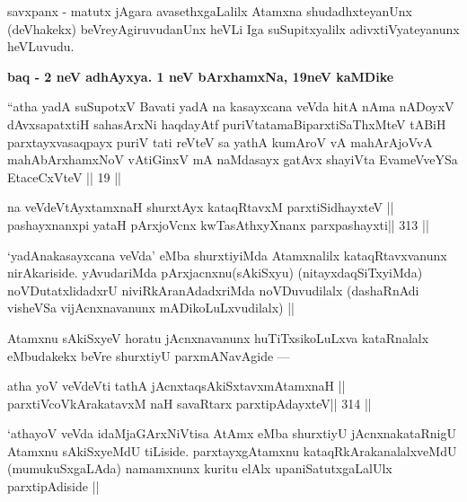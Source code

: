 \begin{artha}
savxpanx - matutx jAgara avasethxgaLalilx Atamxna shudadhxteyanUnx 
(deVhakekx) beVreyAgiruvudanUnx heVLi Iga suSupitxyalilx adivxtiVyateyanunx heVLuvudu.
\end{artha}

\begin{center}
{\large\bf baq - 2 neV adhAyxya. 1 neV bArxhamxNa, 19neV kaMDike}
\end{center}

\begin{shl}
``atha yadA suSupotxV Bavati yadA na kasayxcana veVda
hitA nAma nADoyxV dAvxsapatxtiH sahasArxNi haqdayAtf
puriVtatamaBiparxtiSaThxMteV tABiH parxtayxvasaqpayx puriV
tati reVteV sa yathA kumAroV vA mahArAjoVvA 
mahAbArxhamxNoV vA\s tiGinxV mA naMdasayx gatAvx shayiVta 
EvameVveYSa EtaceCxVteV || 19 ||
\end{shl}


\begin{shl}
na veVdeVtAyxtamxnaH shurxtAyx kataqRtavxM parxtiSidhayxteV ||
pashayxnanxpi yataH pArxjoVcnx kwTasAthxyXnanx parxpashayxti\hfill || 313 ||
\end{shl}

\begin{artha}
`yadAnakasayxcana veVda' eMba shurxtiyiMda Atamxnalilx kataqRtavxvanunx 
nirAkariside. yAvudariMda pArxjacnxnu(sAkiSxyu) (nitayxdaqSiTxyiMda) 
noVDutatxlidadxrU niviRkAranAdadxriMda noVDuvudilalx (dashaRnAdi visheVSa vijAcnxnavanunx mADikoLuLxvudilalx) ||
\end{artha}

\begin{artha}
Atamxnu sAkiSxyeV horatu jAcnxnavanunx huTiTxsikoLuLxva kataRnalalx eMbudakekx beVre shurxtiyU parxmANavAgide ---
\end{artha}

\begin{shl}
\footnotemark[1]atha yoV veVdeVti tathA jAcnxtaqsAkiSxtavxmAtamxnaH ||
parxtiVcoV\s kArakatavxM naH savaRtarx parxtipAdayxteV\hfill || 314 ||
\end{shl}

\begin{artha}
`athayoV veVda idaMjaGArxNiVtisa AtAmx eMba shurxtiyU jAcnxnakataRnigU 
Atamxnu sAkiSxyeMdU tiLiside. parxtayxgAtamxnu kataqRkArakanalalxveMdU (mumukuSxgaLAda) namamxnunx kuritu elAlx upaniSatutxgaLalUlx parxtipAdiside ||
\end{artha}

